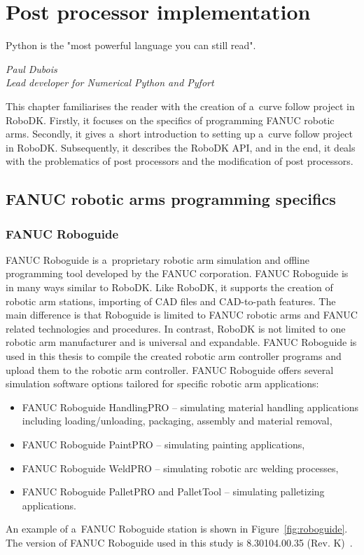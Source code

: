 \chapter{Post processor implementation \label{chap:implementation}}



\epigraph{Python is the "most powerful language you can still read".}{\textit{Paul Dubois \\ Lead developer for Numerical Python and Pyfort }}

This chapter familiarises the reader with the creation of a~curve follow project in RoboDK. Firstly, it focuses on the specifics of programming FANUC robotic arms. Secondly, it gives a~short introduction to setting up a~curve follow project in RoboDK. Subsequently, it describes the RoboDK API, and in the end, it deals with the problematics of post processors and the modification of post processors.

\section{FANUC robotic arms programming specifics}

\subsection{FANUC Roboguide}

FANUC Roboguide is a~proprietary robotic arm simulation and offline programming tool developed by the FANUC corporation. FANUC Roboguide is in many ways similar to RoboDK.  Like RoboDK, it supports the creation of robotic arm stations, importing of CAD files and CAD-to-path features. The main difference is that Roboguide is limited to FANUC robotic arms and FANUC related technologies and procedures. In contrast, RoboDK is not limited to one robotic arm manufacturer and is universal and expandable. FANUC Roboguide is used in this thesis to compile the created robotic arm controller programs and upload them to the robotic arm controller. FANUC Roboguide offers several simulation software options tailored for specific robotic arm applications:

\begin{itemize}

\item FANUC Roboguide HandlingPRO -- simulating material handling applications including loading/unloading, packaging, assembly and material removal,
\item FANUC Roboguide PaintPRO -- simulating painting applications,
\item FANUC Roboguide WeldPRO -- simulating robotic arc welding processes,
\item FANUC Roboguide PalletPRO and PalletTool -- simulating palletizing applications.

\end{itemize}
An example of a~FANUC Roboguide station is shown in Figure~\ref{fig:roboguide}. The version of FANUC Roboguide used in this study is 8.30104.00.35 (Rev. K)~\cite{roboguide}. 

